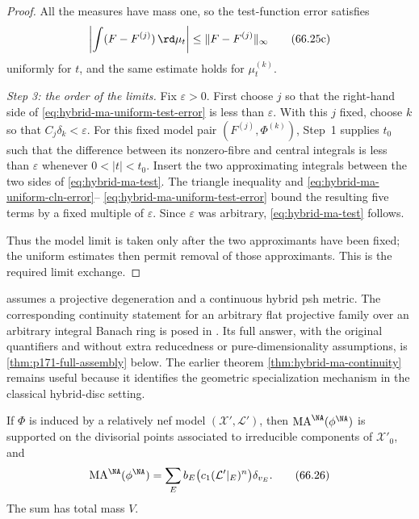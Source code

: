 \begin{proof}
All the measures have mass one, so the test-function error satisfies
\[
 \left|
  \int(F-F^{(j)})\,\rd\mu_t
 \right|
 \leq\|F-F^{(j)}\|_\infty
\tag{66.25c}\label{eq:hybrid-ma-uniform-test-error}
\]
uniformly for $t$, and the same estimate holds for $\mu_t^{(k)}$.

\smallskip
\noindent\emph{Step 3: the order of the limits.}
Fix $\varepsilon>0$.  First choose $j$ so that the right-hand side of
\eqref{eq:hybrid-ma-uniform-test-error} is less than
$\varepsilon$.  With this $j$ fixed, choose $k$ so that
$C_j\delta_k<\varepsilon$.  For this fixed model pair
$(F^{(j)},\Phi^{(k)})$, Step~1 supplies $t_0$ such that the difference
between its nonzero-fibre and central integrals is less than
$\varepsilon$ whenever $0<|t|<t_0$.  Insert the two approximating
integrals between the two sides of \eqref{eq:hybrid-ma-test}.  The triangle
inequality and
\eqref{eq:hybrid-ma-uniform-cln-error}--
\eqref{eq:hybrid-ma-uniform-test-error} bound the resulting five terms by
a fixed multiple of $\varepsilon$.  Since $\varepsilon$ was arbitrary,
\eqref{eq:hybrid-ma-test} follows.

Thus the model limit is taken only after the two approximants have been
fixed; the uniform estimates then permit removal of those approximants.
This is the required limit exchange.
\end{proof}

\begin{remark}
\label{fire:hybrid-general-ma}
 assumes a projective degeneration and a continuous hybrid psh metric. The corresponding continuity statement for an arbitrary flat projective family over an arbitrary integral Banach ring is posed in \cite[Question~4.9]{PS23Hybrid}.  Its full answer, with the original quantifiers and without extra reducedness or pure-dimensionality assumptions, is \cref{thm:p171-full-assembly} below.  The earlier theorem \cref{thm:hybrid-ma-continuity} remains useful because it identifies the geometric specialization mechanism in the classical hybrid-disc setting.
\end{remark}

\begin{corollary}\label{cor:hybrid-model-ma}
If $\Phi$ is induced by a relatively nef model $(\mathcal X',\mathcal L')$, then $\operatorname{MA}^{\NA}(\phi^{\NA})$ is supported on the divisorial points associated to irreducible components of $\mathcal X'_0$, and
\[
 \operatorname{MA}^{\NA}(\phi^{\NA})
   =\sum_E b_E\bigl(c_1(\mathcal L'|_E)^n\bigr)\delta_{v_E}.
\tag{66.26}\label{eq:hybrid-model-ma}
\]
The sum has total mass $V$.
\end{corollary}

